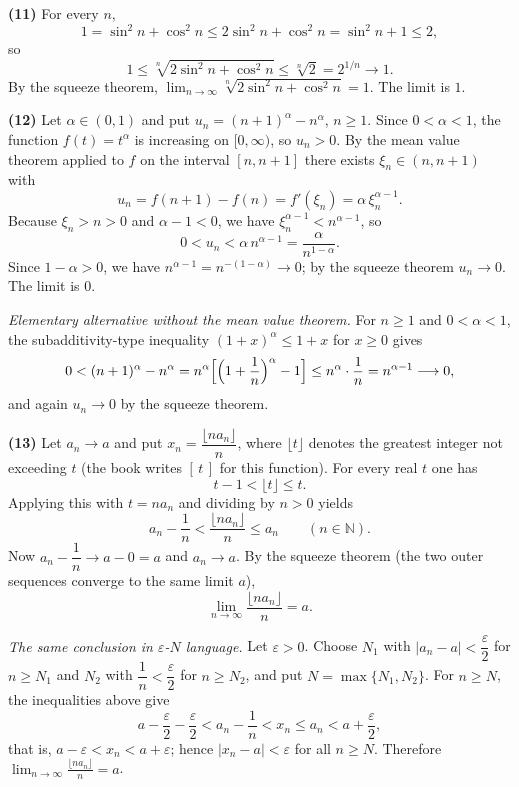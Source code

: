 \documentclass[11pt,a4paper]{article}
\newenvironment{solution}[1]{%
  \par\addvspace{1.7ex}%
  \noindent{\color{solutioncolor}\textbf{#1}}\hspace{0.55em}\ignorespaces}%
  {\par\addvspace{0.9ex}}
\begin{document}
\begin{solution}{Solution 2.1.4}
\medskip
\noindent\textbf{(11)} For every $n$,
\[
  1=\sin^{2}n+\cos^{2}n\le 2\sin^{2}n+\cos^{2}n=\sin^{2}n+1\le2,
\]
so
\[
  1\le\sqrt[n]{2\sin^{2}n+\cos^{2}n}\le\sqrt[n]{2}=2^{1/n}\longrightarrow1 .
\]
By the squeeze theorem,
$\displaystyle\lim_{n\to\infty}\sqrt[n]{2\sin^{2}n+\cos^{2}n}=1$. The limit is
$\boxed{1}$.

\medskip
\noindent\textbf{(12)} Let $\alpha\in(0,1)$ and put
$u_n=(n+1)^{\alpha}-n^{\alpha}$, $n\ge1$. Since $0<\alpha<1$, the function
$f(t)=t^{\alpha}$ is increasing on $[0,\infty)$, so $u_n>0$. By the mean value
theorem applied to $f$ on the interval $[n,n+1]$ there exists
$\xi_n\in(n,n+1)$ with
\[
  u_n=f(n+1)-f(n)=f'(\xi_n)=\alpha\,\xi_n^{\alpha-1} .
\]
Because $\xi_n>n>0$ and $\alpha-1<0$, we have
$\xi_n^{\alpha-1}<n^{\alpha-1}$, so
\[
  0<u_n<\alpha\,n^{\alpha-1}=\frac{\alpha}{n^{1-\alpha}} .
\]
Since $1-\alpha>0$, we have $n^{\alpha-1}=n^{-(1-\alpha)}\to0$; by the squeeze
theorem $u_n\to0$. The limit is $\boxed{0}$.

\emph{Elementary alternative without the mean value theorem.} For $n\ge1$ and
$0<\alpha<1$, the subadditivity-type inequality
$(1+x)^{\alpha}\le 1+x$ for $x\ge0$ gives
\[
  0<(n+1)^{\alpha}-n^{\alpha}
  =n^{\alpha}\Bigl[\Bigl(1+\frac1n\Bigr)^{\alpha}-1\Bigr]
  \le n^{\alpha}\cdot\frac1n=n^{\alpha-1}\longrightarrow0 ,
\]
and again $u_n\to0$ by the squeeze theorem.

\medskip
\noindent\textbf{(13)} Let $a_n\to a$ and put
$x_n=\dfrac{\lfloor na_n\rfloor}{n}$, where $\lfloor t\rfloor$ denotes the
greatest integer not exceeding $t$ (the book writes $[\,t\,]$ for this function).
For every real $t$ one has
\[
  t-1<\lfloor t\rfloor\le t .
\]
Applying this with $t=na_n$ and dividing by $n>0$ yields
\[
  a_n-\frac1n<\frac{\lfloor na_n\rfloor}{n}\le a_n
  \qquad(n\in\mathbb{N}).
\]
Now $a_n-\dfrac1n\to a-0=a$ and $a_n\to a$. By the squeeze theorem (the two
outer sequences converge to the same limit $a$),
\[
  \lim_{n\to\infty}\frac{\lfloor na_n\rfloor}{n}=a .
\]

\emph{The same conclusion in $\varepsilon$-$N$ language.} Let $\varepsilon>0$.
Choose $N_1$ with $|a_n-a|<\dfrac\varepsilon2$ for $n\ge N_1$ and $N_2$ with
$\dfrac1n<\dfrac\varepsilon2$ for $n\ge N_2$, and put $N=\max\{N_1,N_2\}$. For
$n\ge N$, the inequalities above give
\[
  a-\frac\varepsilon2-\frac\varepsilon2<a_n-\frac1n<x_n\le a_n<a+\frac\varepsilon2,
\]
that is, $a-\varepsilon<x_n<a+\varepsilon$; hence $|x_n-a|<\varepsilon$ for all
$n\ge N$. Therefore $\displaystyle\lim_{n\to\infty}\frac{\lfloor na_n\rfloor}{n}=a$.
\end{solution}
\end{document}
